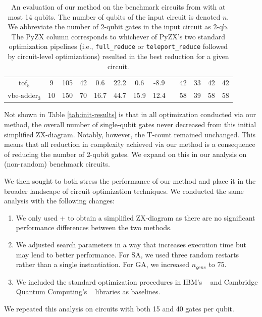 \begin{table}[t]
\begin{tabular}{@{}ccccccccccccc@{}}
$\text{tof}_5$               & 9  & 105  & 42  & 0.6  & 22.2  & 0.6  & -8.9  &  & 42  & 33  & 42  & 42  \\
$\text{vbe-adder}_3$         & 10 & 150  & 70  & 16.7 & 44.7  & 15.9 & 12.4  &  & 58  & 39  & 58  & 58  \\ \bottomrule
\end{tabular}
\caption{\label{tab:bench}
  An evaluation of our method on the benchmark circuits from \cite{kissinger2019reducing} with at most 14 qubits.
  The number of qubits of the input circuit is denoted $n$.
  We abbreviate the number of 2-qubit gates in the input circuit as 2-qb.
  The PyZX column corresponds to whichever of PyZX's two standard optimization pipelines (i.e., {\color{gray}\texttt{full\_reduce}} or {\color{gray}\texttt{teleport\_reduce}} followed by circuit-level optimizations) resulted in the best reduction for a given circuit.
}
\end{table}








Not shown in Table \ref{tab:init-results} is that in all optimization conducted via our method, the overall number of single-qubit gates never decreased from this initial simplified ZX-diagram.
Notably, however, the T-count remained unchanged.
This means that all reduction in complexity achieved via our method is a consequence of reducing the number of 2-qubit gates.
We expand on this in our analysis on (non-random) benchmark circuits.

We then sought to both stress the performance of our method and place it in the broader landscape of circuit optimization techniques.
We conducted the same analysis with the following changes:
\begin{enumerate}
\item
  We only used  +  to obtain a simplified ZX-diagram as there are no significant performance differences between the two methods.
\item
  We adjusted search parameters in a way that increases execution time but may lend to better performance.
  For SA, we used three random restarts rather than a single instantiation.
  For GA, we increased $n_{gens}$ to 75.
\item
  We included the standard optimization procedures in IBM's ~\cite{Qiskit} and Cambridge Quantum Computing's ~\cite{sivarajah2020t} libraries as baselines.
\end{enumerate}
We repeated this analysis on circuits with both 15 and 40 gates per qubit.

